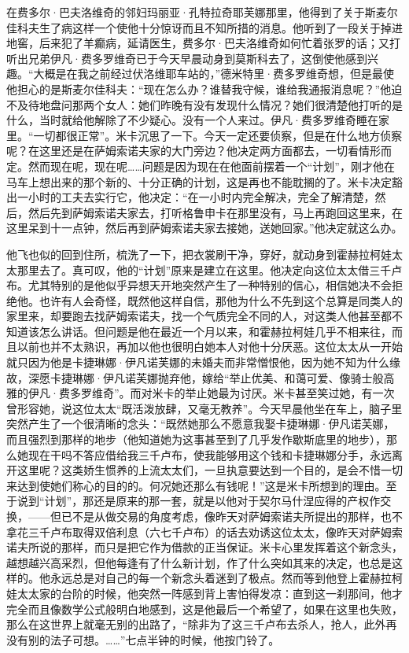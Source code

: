 \par 在费多尔·巴夫洛维奇的邻妇玛丽亚·孔特拉奇耶芙娜那里，他得到了关于斯麦尔佳科夫生了病这样一个使他十分惊讶而且不知所措的消息。他听到了一段关于掉进地窖，后来犯了羊癫病，延请医生，费多尔·巴夫洛维奇如何忙着张罗的话；又打听出兄弟伊凡·费多罗维奇已于今天早晨动身到莫斯科去了，这倒使他感到兴趣。“大概是在我之前经过伏洛维耶车站的，”德米特里·费多罗维奇想，但是最使他担心的是斯麦尔佳科夫：“现在怎么办？谁替我守候，谁给我通报消息呢？”他迫不及待地盘问那两个女人：她们昨晚有没有发现什么情况？她们很清楚他打听的是什么，当时就给他解除了不少疑心。没有一个人来过。伊凡·费多罗维奇睡在家里。“一切都很正常”。米卡沉思了一下。今天一定还要侦察，但是在什么地方侦察呢？在这里还是在萨姆索诺夫家的大门旁边？他决定两方面都去，一切看情形而定。然而现在呢，现在呢……问题是因为现在在他面前摆着一个“计划”，刚才他在马车上想出来的那个新的、十分正确的计划，这是再也不能耽搁的了。米卡决定豁出一小时的工夫去实行它，他决定：“在一小时内完全解决，完全了解清楚，然后，然后先到萨姆索诺夫家去，打听格鲁申卡在那里没有，马上再跑回这里来，在这里呆到十一点钟，然后再到萨姆索诺夫家去接她，送她回家。”他决定就这么办。
\par 他飞也似的回到住所，梳洗了一下，把衣裳刷干净，穿好，就动身到霍赫拉柯娃太太那里去了。真可叹，他的“计划”原来是建立在这里。他决定向这位太太借三千卢布。尤其特别的是他似乎异想天开地突然产生了一种特别的信心，相信她决不会拒绝他。也许有人会奇怪，既然他这样自信，那他为什么不先到这个总算是同类人的家里来，却要跑去找萨姆索诺夫，找一个气质完全不同的人，对这类人他甚至都不知道该怎么讲话。但问题是他在最近一个月以来，和霍赫拉柯娃几乎不相来往，而且以前也并不太熟识，再加以他也很明白她本人对他十分厌恶。这位太太从一开始就只因为他是卡捷琳娜·伊凡诺芙娜的未婚夫而非常憎恨他，因为她不知为什么缘故，深愿卡捷琳娜·伊凡诺芙娜抛弃他，嫁给“举止优美、和蔼可爱、像骑士般高雅的伊凡·费多罗维奇”。而对米卡的举止她最为讨厌。米卡甚至笑过她，有一次曾形容她，说这位太太“既活泼放肆，又毫无教养”。今天早晨他坐在车上，脑子里突然产生了一个很清晰的念头：“既然她那么不愿意我娶卡捷琳娜·伊凡诺芙娜，而且强烈到那样的地步（他知道她为这事甚至到了几乎发作歇斯底里的地步），那么她现在干吗不答应借给我三千卢布，使我能够用这个钱和卡捷琳娜分手，永远离开这里呢？这类娇生惯养的上流太太们，一旦执意要达到一个目的，是会不惜一切来达到使她们称心的目的的。何况她还那么有钱呢！”这是米卡所想到的理由。至于说到“计划”，那还是原来的那一套，就是以他对于契尔马什涅应得的产权作交换，——但已不是从做交易的角度考虑，像昨天对萨姆索诺夫所提出的那样，也不拿花三千卢布取得双倍利息（六七千卢布）的话去劝诱这位太太，像昨天对萨姆索诺夫所说的那样，而只是把它作为借款的正当保证。米卡心里发挥着这个新念头，越想越兴高采烈，但他每逢有了什么新计划，作了什么突如其来的决定，也总是这样的。他永远总是对自己的每一个新念头着迷到了极点。然而等到他登上霍赫拉柯娃太太家的台阶的时候，他突然一阵感到背上害怕得发凉：直到这一刹那间，他才完全而且像数学公式般明白地感到，这是他最后一个希望了，如果在这里也失败，那么在这世界上就毫无别的出路了，“除非为了这三千卢布去杀人，抢人，此外再没有别的法子可想。……”七点半钟的时候，他按门铃了。
